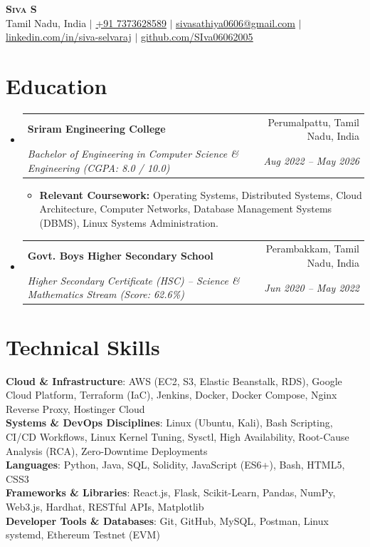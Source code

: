 \documentclass[letterpaper,11pt]{article}
\makeatletter
\newcommand{\resumeItem}[1]{
  \item\small{
    {#1 \vspace{-2pt}}
  }
}
\newcommand{\resumeSubheading}[4]{
  \vspace{-2pt}\item
    \begin{tabular*}{0.97\textwidth}[t]{l@{\extracolsep{\fill}}r}
      \textbf{#1} & #2 \\
      \textit{\small#3} & \textit{\small #4} \\
    \end{tabular*}\vspace{-7pt}
}
\newcommand{\resumeSubHeadingListStart}{\begin{itemize}[leftmargin=0.15in, label={}]}
\newcommand{\resumeSubHeadingListEnd}{\end{itemize}}
\newcommand{\resumeItemListStart}{\begin{itemize}}
\newcommand{\resumeItemListEnd}{\end{itemize}\vspace{-5pt}}
\makeatother
\begin{document}
\begin{center}
    \textbf{\Huge \scshape Siva S} \\ \vspace{3pt}
    \small Tamil Nadu, India $|$ 
    \href{tel:+917373628589}{+91 7373628589} $|$ 
    \href{mailto:sivasathiya0606@gmail.com}{\underline{sivasathiya0606@gmail.com}} $|$ 
    \href{https://www.linkedin.com/in/siva-selvaraj-0472432a1}{\underline{linkedin.com/in/siva-selvaraj}} $|$ 
    \href{https://github.com/SIva06062005}{\underline{github.com/SIva06062005}}
\end{center}

\section{Education}
  \resumeSubHeadingListStart
    \resumeSubheading
      {Sriram Engineering College}{Perumalpattu, Tamil Nadu, India}
      {Bachelor of Engineering in Computer Science \& Engineering (CGPA: 8.0 / 10.0)}{Aug 2022 -- May 2026}
      \resumeItemListStart
        \resumeItem{\textbf{Relevant Coursework:} Operating Systems, Distributed Systems, Cloud Architecture, Computer Networks, Database Management Systems (DBMS), Linux Systems Administration.}
      \resumeItemListEnd
    \resumeSubheading
      {Govt. Boys Higher Secondary School}{Perambakkam, Tamil Nadu, India}
      {Higher Secondary Certificate (HSC) -- Science \& Mathematics Stream (Score: 62.6\%)}{Jun 2020 -- May 2022}
  \resumeSubHeadingListEnd

\section{Technical Skills}
 \begin{itemize}[leftmargin=0.15in, label={}]
    \small{\item{
     \textbf{Cloud \& Infrastructure}{: AWS (EC2, S3, Elastic Beanstalk, RDS), Google Cloud Platform, Terraform (IaC), Jenkins, Docker, Docker Compose, Nginx Reverse Proxy, Hostinger Cloud} \\
     \textbf{Systems \& DevOps Disciplines}{: Linux (Ubuntu, Kali), Bash Scripting, CI/CD Workflows, Linux Kernel Tuning, Sysctl, High Availability, Root-Cause Analysis (RCA), Zero-Downtime Deployments} \\
     \textbf{Languages}{: Python, Java, SQL, Solidity, JavaScript (ES6+), Bash, HTML5, CSS3} \\
     \textbf{Frameworks \& Libraries}{: React.js, Flask, Scikit-Learn, Pandas, NumPy, Web3.js, Hardhat, RESTful APIs, Matplotlib} \\
     \textbf{Developer Tools \& Databases}{: Git, GitHub, MySQL, Postman, Linux systemd, Ethereum Testnet (EVM)}
    }}
 \end{itemize}
\end{document}
